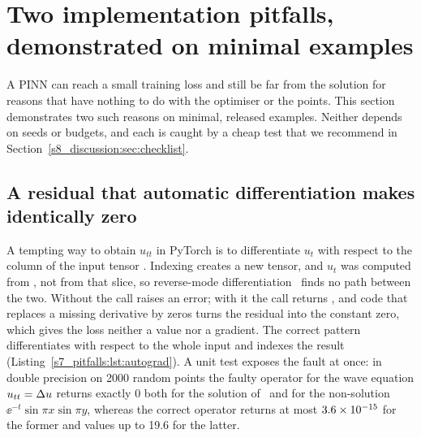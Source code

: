 \section{Two implementation pitfalls, demonstrated on minimal examples}\label{s7_pitfalls:sec}

A PINN can reach a small training loss and still be far from the solution for reasons that
have nothing to do with the optimiser or the points. This section demonstrates two such
reasons on minimal, released examples. Neither depends on seeds or budgets, and each is caught
by a cheap test that we recommend in Section~\ref{s8_discussion:sec:checklist}.

\subsection{A residual that automatic differentiation makes identically zero}%
\label{s7_pitfalls:sec:autograd}

A tempting way to obtain $u_{tt}$ in PyTorch is to differentiate $u_t$ with respect to the
column  of the input tensor . Indexing creates a new tensor, and $u_t$ was
computed from , not from that slice, so reverse-mode differentiation~\citep{paszke2019}
finds no path between the two. Without  the call raises an error; with
it the call returns , and code that replaces a missing derivative by zeros turns the
residual into the constant zero, which gives the loss neither a value nor a gradient. The correct
pattern differentiates with respect to the whole input and indexes the result
(Listing~\ref{s7_pitfalls:lst:autograd}).
A unit test exposes the fault at once: in double precision on 2000 random points the faulty
operator for the wave equation $u_{tt}=\Delta u$ returns exactly 0 both for the solution of \PWtwo\
and for the non-solution $\ee^{-t}\sin\pi x\sin\pi y$, whereas the correct operator returns at
most $3.6\times 10^{-15}$ for the former and values up to 19.6 for the latter.

